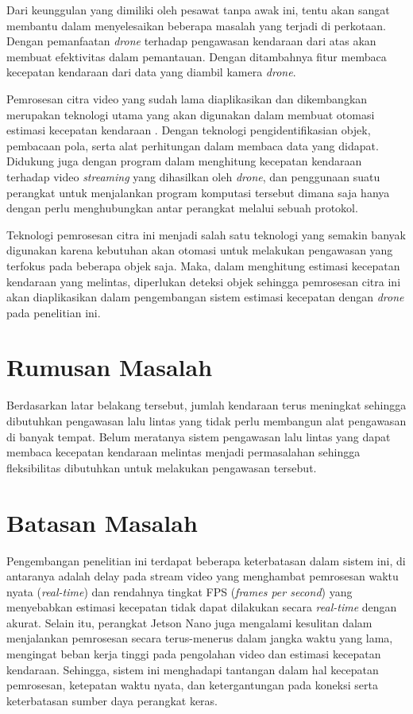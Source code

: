 Dari keunggulan yang dimiliki oleh pesawat tanpa awak ini, tentu akan sangat membantu dalam menyelesaikan beberapa masalah yang terjadi di perkotaan. Dengan pemanfaatan \emph{drone} terhadap pengawasan kendaraan dari atas akan membuat efektivitas dalam pemantauan. Dengan ditambahnya fitur membaca kecepatan kendaraan dari data yang diambil kamera \emph{drone}. 

Pemrosesan citra video yang sudah lama diaplikasikan dan dikembangkan merupakan teknologi utama yang akan digunakan dalam membuat otomasi estimasi kecepatan kendaraan \cite{Tekalp1995}. Dengan teknologi pengidentifikasian objek, pembacaan pola, serta alat perhitungan dalam membaca data yang didapat. Didukung juga dengan program dalam menghitung kecepatan kendaraan terhadap video \emph{streaming} yang dihasilkan oleh \emph{drone}, dan penggunaan suatu perangkat untuk menjalankan program komputasi tersebut dimana saja hanya dengan perlu menghubungkan antar perangkat melalui sebuah protokol.

Teknologi pemrosesan citra ini menjadi salah satu teknologi yang semakin banyak digunakan karena kebutuhan akan otomasi untuk melakukan pengawasan yang terfokus pada beberapa objek saja. Maka, dalam menghitung estimasi kecepatan kendaraan yang melintas, diperlukan deteksi objek sehingga pemrosesan citra ini akan diaplikasikan dalam pengembangan sistem estimasi kecepatan dengan \emph{drone} pada penelitian ini.

\section{Rumusan Masalah}
Berdasarkan latar belakang tersebut, jumlah kendaraan terus meningkat sehingga dibutuhkan pengawasan lalu lintas yang tidak perlu membangun alat pengawasan di banyak tempat. Belum meratanya sistem pengawasan lalu lintas yang dapat membaca kecepatan kendaraan melintas menjadi permasalahan sehingga fleksibilitas dibutuhkan untuk melakukan pengawasan tersebut.

\section{Batasan Masalah}
Pengembangan penelitian ini terdapat beberapa keterbatasan dalam sistem ini, di antaranya adalah delay pada stream video yang menghambat pemrosesan waktu nyata (\emph{real-time}) dan rendahnya tingkat FPS (\emph{frames per second}) yang menyebabkan estimasi kecepatan tidak dapat dilakukan secara \emph{real-time} dengan akurat. Selain itu, perangkat Jetson Nano juga mengalami kesulitan dalam menjalankan pemrosesan secara terus-menerus dalam jangka waktu yang lama, mengingat beban kerja tinggi pada pengolahan video dan estimasi kecepatan kendaraan. Sehingga, sistem ini menghadapi tantangan dalam hal kecepatan pemrosesan, ketepatan waktu nyata, dan ketergantungan pada koneksi serta keterbatasan sumber daya perangkat keras.


